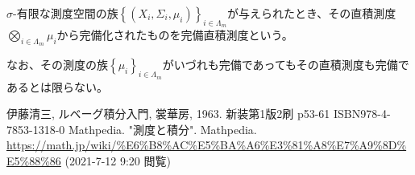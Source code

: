 \documentclass[dvipdfmx]{jsarticle}
\begin{document}
\begin{dfn}
$\sigma$-有限な測度空間の族$\left\{ \left( X_{i},\varSigma_{i},\mu_{i} \right) \right\}_{i \in \varLambda_{m} }$が与えられたとき、その直積測度$\bigotimes_{i \in \varLambda_{m}} \mu_{i}$から完備化されたものを完備直積測度という。
\end{dfn}\par
なお、その測度の族$\left\{ \mu_{i} \right\}_{i \in \varLambda_{m}}$がいづれも完備であってもその直積測度も完備であるとは限らない。
\begin{thebibliography}{50}
  伊藤清三, ルベーグ積分入門, 裳華房, 1963. 新装第1版2刷 p53-61 ISBN978-4-7853-1318-0
  Mathpedia. "測度と積分". Mathpedia. \url{https://math.jp/wiki/%E6%B8%AC%E5%BA%A6%E3%81%A8%E7%A9%8D%E5%88%86} (2021-7-12 9:20 閲覧)
\end{thebibliography}
\end{document}
